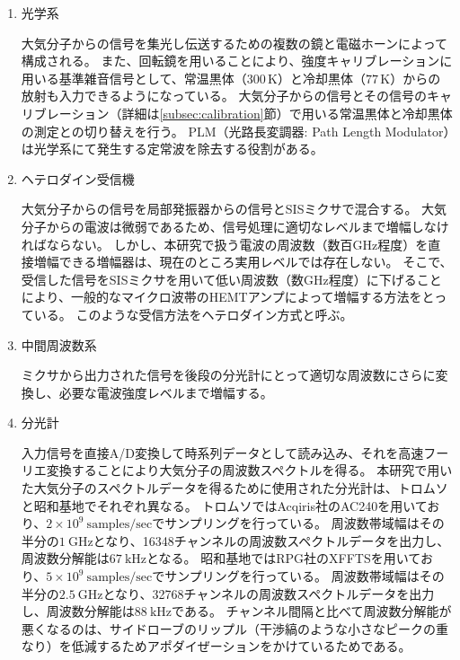 \begin{enumerate}
    \item 光学系 \par
        大気分子からの信号を集光し伝送するための複数の鏡と電磁ホーンによって構成される。
        また、回転鏡を用いることにより、強度キャリブレーションに用いる基準雑音信号として、常温黒体（$300\, \mathrm{K}$）と冷却黒体（$77\, \mathrm{K}$）からの放射も入力できるようになっている。
        大気分子からの信号とその信号のキャリブレーション（詳細は\ref{subsec:calibration}節）で用いる常温黒体と冷却黒体の測定との切り替えを行う。
        PLM（光路長変調器: Path Length Modulator）は光学系にて発生する定常波を除去する役割がある。
    \item ヘテロダイン受信機 \par
        大気分子からの信号を局部発振器からの信号とSISミクサで混合する。
        大気分子からの電波は微弱であるため、信号処理に適切なレベルまで増幅しなければならない。
        しかし、本研究で扱う電波の周波数（数百GHz程度）を直接増幅できる増幅器は、現在のところ実用レベルでは存在しない。
        そこで、受信した信号をSISミクサを用いて低い周波数（数GHz程度）に下げることにより、一般的なマイクロ波帯のHEMTアンプによって増幅する方法をとっている。
        このような受信方法をヘテロダイン方式と呼ぶ。
    \item 中間周波数系 \par
        ミクサから出力された信号を後段の分光計にとって適切な周波数にさらに変換し、必要な電波強度レベルまで増幅する。
    \item 分光計 \par
        入力信号を直接A/D変換して時系列データとして読み込み、それを高速フーリエ変換することにより大気分子の周波数スペクトルを得る。
        本研究で用いた大気分子のスペクトルデータを得るために使用された分光計は、トロムソと昭和基地でそれぞれ異なる。
        トロムソではAcqiris社のAC240を用いており、$2\times 10^9\ \mathrm{samples/sec}$でサンプリングを行っている。
        周波数帯域幅はその半分の$1\ \mathrm{GHz}$となり、16348チャンネルの周波数スペクトルデータを出力し、周波数分解能は$67\ \mathrm{kHz}$となる。
        昭和基地ではRPG社のXFFTSを用いており、$5\times 10^9\ \mathrm{samples/sec}$でサンプリングを行っている。
        周波数帯域幅はその半分の$2.5\ \mathrm{GHz}$となり、32768チャンネルの周波数スペクトルデータを出力し、周波数分解能は$88\ \mathrm{kHz}$である。
        チャンネル間隔と比べて周波数分解能が悪くなるのは、サイドローブのリップル（干渉縞のような小さなピークの重なり）を低減するためアポダイぜーションをかけているためである。
\end{enumerate} \par
